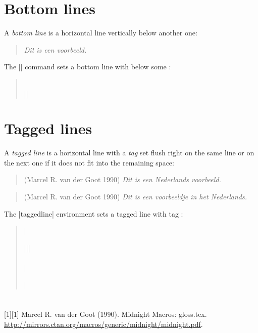 \documentclass[a4paper]{ltxdoc}
\begin{document}
\section{Bottom lines}

A \emph{bottom line} is a horizontal line vertically below another one:
\begin{quote}
\textdutch{\textit{Dit is een voorbeeld.}}
\end{quote}

\DescribeMacro{\bottomline} The |\bottomline| command sets a bottom line with
 below some :
\begin{quote}
 \\
||
\end{quote}

\section{Tagged lines}

A \emph{tagged line} is a horizontal line with a \emph{tag} set flush right on
the same line or on the next one if it does not fit into the remaining space:
\begin{quote}
\begin{taggedline}{(Marcel R. van der Goot 1990)}
\textdutch{\textit{Dit is een Nederlands voorbeeld.}}
\end{taggedline}
\end{quote}
\begin{quote}
\begin{taggedline}{(Marcel R. van der Goot 1990)}
\textdutch{\textit{Dit is een voorbeeldje in het Nederlands.}}
\end{taggedline}
\end{quote}

 The |taggedline| environment sets a tagged line
 with tag :
\begin{quote}
|\begin{taggedline}{||}| \\
 \\
|\end{taggedline}|
\end{quote}

\section*{\refname}
\begin{labeledpar}{{[1]}}{\hypertarget{goot}{[1]}}
Marcel R. van der Goot (1990). Midnight Macros: \textsf{gloss.tex}.
\url{http://mirrors.ctan.org/macros/generic/midnight/midnight.pdf}.
\end{labeledpar}
\end{document}
